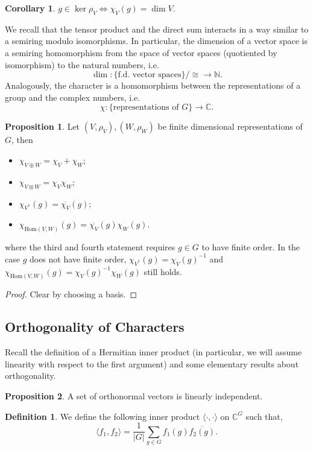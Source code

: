 \documentclass[]{article}
\theoremstyle{definition}
\newtheorem{corollary}{Corollary}[theorem]
\theoremstyle{definition}
\newtheorem{definition}{Definition}[section]
\newtheorem{proposition}{Proposition}[section]
\begin{document}
\begin{corollary}
  \(g \in \ker \rho_V \iff \chi_V(g) = \dim V\).
\end{corollary}

We recall that the tensor product and the direct sum interacts in a way 
similar to a semiring modulo isomorphisms. In particular, the 
dimension of a vector space is a semiring homomorphism from the space 
of vector spaces (quotiented by isomorphism) to the natural numbers, i.e. 
\[\dim : \{\text{f.d. vector spaces}\} / \cong \to \mathbb{N}.\]
Analogously, the character is a homomorphism between the representations of 
a group and the complex numbers, i.e. 
\[\chi : \{\text{representations of } G\} \to \mathbb{C}.\]

\begin{proposition}
  Let \((V, \rho_V), (W, \rho_W)\) be finite dimensional representations of 
  \(G\), then 
  \begin{itemize}
    \item \(\chi_{V \oplus W} = \chi_V + \chi_W\);
    \item \(\chi_{V \otimes W} = \chi_V \chi_W\);
    \item \(\chi_{V^*}(g) = \overline{\chi_V}(g)\);
    \item \(\chi_{\text{Hom}(V, W)}(g) = \overline{\chi_V}(g) \chi_W(g)\).
  \end{itemize}
  where the third and fourth statement requires \(g \in G\) to have finite order.
  In the case \(g\) does not have finite order, 
  \(\chi_{V^*}(g) = \chi_V(g)^{-1}\) and 
  \(\chi_{\text{Hom}(V, W)}(g) = \chi_V(g)^{-1} \chi_W(g)\) still holds.
\end{proposition}
\begin{proof}
  Clear by choosing a basis.
\end{proof}

\subsection{Orthogonality of Characters}

Recall the definition of a Hermitian inner product (in particular, we will 
assume linearity with respect to the first argument) and some elementary 
results about orthogonality. 

\begin{proposition}
  A set of orthonormal vectors is linearly independent.
\end{proposition}

\begin{definition}
  We define the following inner product 
  \(\langle \cdot, \cdot \rangle\) on \(\mathbb{C}^G\) such that, 
  \[\langle f_1, f_2 \rangle = \frac{1}{|G|} \sum_{g \in G} f_1(g) 
    \overline{f_2(g)}.\]
\end{definition}
\end{document}

